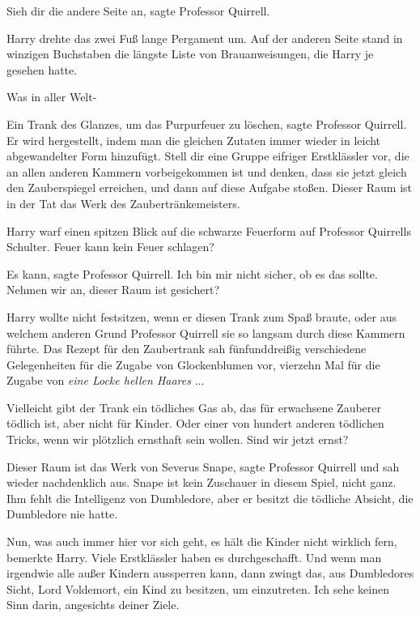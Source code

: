 \glqq{}Sieh dir die andere Seite an\grqq{}, sagte Professor Quirrell.

Harry drehte das zwei Fuß lange Pergament um. Auf der anderen Seite stand in
winzigen Buchstaben die längste Liste von Brauanweisungen, die Harry je gesehen
hatte.

\glqq{}Was in aller Welt-\grqq{}

\glqq{}Ein Trank des Glanzes, um das Purpurfeuer zu löschen\grqq{}, sagte
Professor Quirrell. \glqq{}Er wird hergestellt, indem man die gleichen Zutaten
immer wieder in leicht abgewandelter Form hinzufügt. Stell dir eine Gruppe
eifriger Erstklässler vor, die an allen anderen Kammern vorbeigekommen ist und
denken, dass sie jetzt gleich den Zauberspiegel erreichen, und dann auf diese
Aufgabe stoßen. Dieser Raum ist in der Tat das Werk des Zaubertränkemeisters.\grqq{}

Harry warf einen spitzen Blick auf die schwarze Feuerform auf Professor
Quirrells Schulter. \glqq{}Feuer kann kein Feuer schlagen?\grqq{}

\glqq{}Es kann\grqq{}, sagte Professor Quirrell. \glqq{}Ich bin mir nicht sicher,
ob es das sollte. Nehmen wir an, dieser Raum ist gesichert?\grqq{}

Harry wollte nicht festsitzen, wenn er diesen Trank zum Spaß braute, oder aus
welchem anderen Grund Professor Quirrell sie so langsam durch diese Kammern
führte. Das Rezept für den Zaubertrank sah fünfunddreißig verschiedene
Gelegenheiten für die Zugabe von Glockenblumen vor, vierzehn Mal für die Zugabe
von \emph{\glqq{}eine Locke hellen Haares\grqq{}} ...

\glqq{}Vielleicht gibt der Trank ein tödliches Gas ab, das für erwachsene
Zauberer tödlich ist, aber nicht für Kinder. Oder einer von hundert anderen
tödlichen Tricks, wenn wir plötzlich ernsthaft sein wollen. Sind wir jetzt
ernst?\grqq{}

\glqq{}Dieser Raum ist das Werk von Severus Snape\grqq{}, sagte Professor
Quirrell und sah wieder nachdenklich aus. \glqq{}Snape ist kein Zuschauer in
diesem Spiel, nicht ganz. Ihm fehlt die Intelligenz von Dumbledore, aber er
besitzt die tödliche Absicht, die Dumbledore nie hatte.\grqq{}

\glqq{}Nun, was auch immer hier vor sich geht, es hält die Kinder nicht wirklich
fern\grqq{}, bemerkte Harry. \glqq{}Viele Erstklässler haben es durchgeschafft.
Und wenn man irgendwie alle außer Kindern aussperren kann, dann zwingt das, aus
Dumbledores Sicht, Lord Voldemort, ein Kind zu besitzen, um einzutreten. Ich
sehe keinen Sinn darin, angesichts deiner Ziele.\grqq{}


